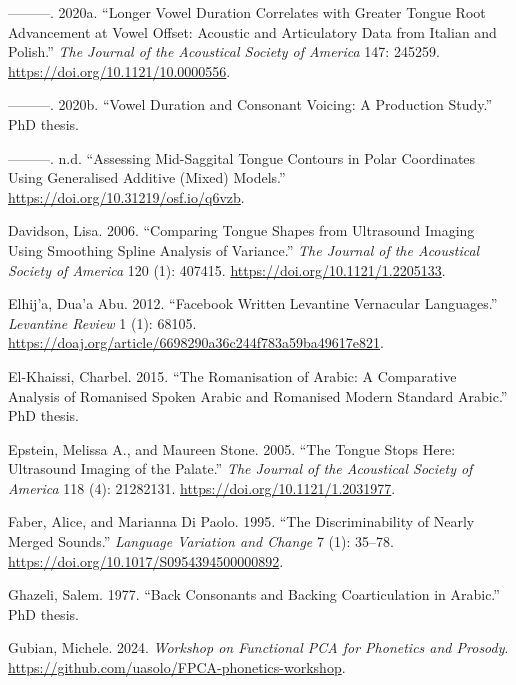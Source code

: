 \documentclass[
]{interact}
\newlength{\cslhangindent}
\newenvironment{CSLReferences}[2] %
 {\begin{list}{}{%
  \setlength{\itemindent}{0pt}
  \setlength{\leftmargin}{0pt}
  \setlength{\parsep}{0pt}
  \ifodd #1
   \setlength{\leftmargin}{\cslhangindent}
   \setlength{\itemindent}{-1\cslhangindent}
  \fi
  \setlength{\itemsep}{#2\baselineskip}}}
 {\end{list}}
\begin{document}
\begin{CSLReferences}{1}{0}
---------. 2020a. {``Longer Vowel Duration Correlates with Greater
Tongue Root Advancement at Vowel Offset: Acoustic and Articulatory Data
from Italian and Polish.''} \emph{The Journal of the Acoustical Society
of America} 147: 245259. \url{https://doi.org/10.1121/10.0000556}.

---------. 2020b. {``Vowel Duration and Consonant Voicing: A Production
Study.''} PhD thesis.

---------. n.d. {``Assessing Mid-Saggital Tongue Contours in Polar
Coordinates Using Generalised Additive (Mixed) Models.''}
\url{https://doi.org/10.31219/osf.io/q6vzb}.

Davidson, Lisa. 2006. {``Comparing Tongue Shapes from Ultrasound Imaging
Using Smoothing Spline Analysis of Variance.''} \emph{The Journal of the
Acoustical Society of America} 120 (1): 407415.
\url{https://doi.org/10.1121/1.2205133}.

Elhij'a, Dua'a Abu. 2012. {``Facebook Written Levantine Vernacular
Languages.''} \emph{Levantine Review} 1 (1): 68105.
\url{https://doaj.org/article/6698290a36c244f783a59ba49617e821}.

El-Khaissi, Charbel. 2015. {``The Romanisation of Arabic: A Comparative
Analysis of Romanised Spoken Arabic and Romanised Modern Standard
Arabic.''} PhD thesis.

Epstein, Melissa A., and Maureen Stone. 2005. {``The Tongue Stops Here:
Ultrasound Imaging of the Palate.''} \emph{The Journal of the Acoustical
Society of America} 118 (4): 21282131.
\url{https://doi.org/10.1121/1.2031977}.

Faber, Alice, and Marianna Di Paolo. 1995. {``The Discriminability of
Nearly Merged Sounds.''} \emph{Language Variation and Change} 7 (1):
35--78. \url{https://doi.org/10.1017/S0954394500000892}.

Ghazeli, Salem. 1977. {``Back Consonants and Backing Coarticulation in
Arabic.''} PhD thesis.

Gubian, Michele. 2024. \emph{Workshop on Functional PCA for Phonetics
and Prosody}. \url{https://github.com/uasolo/FPCA-phonetics-workshop}.


\end{CSLReferences}
\end{document}
